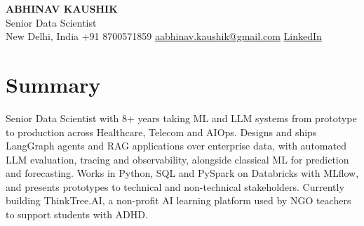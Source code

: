 \documentclass[10pt,a4paper]{article}
\begin{document}
\begin{center}
  {\LARGE\bfseries ABHINAV KAUSHIK}\\[2pt]
  {\large Senior Data Scientist}\\[2pt]
  New Delhi, India \textbar{} +91 8700571859 \textbar{} \href{mailto:aabhinav.kaushik@gmail.com}{aabhinav.kaushik@gmail.com} \textbar{} \href{https://www.linkedin.com/in/abhinav-kaushik10/}{LinkedIn}  
\end{center}

\section{Summary}
Senior Data Scientist with 8+ years taking ML and LLM systems from prototype to production across Healthcare, Telecom and AIOps. Designs and ships LangGraph agents and RAG applications over enterprise data, with automated LLM evaluation, tracing and observability, alongside classical ML for prediction and forecasting. Works in Python, SQL and PySpark on Databricks with MLflow, and presents prototypes to technical and non-technical stakeholders. Currently building ThinkTree.AI, a non-profit AI learning platform used by NGO teachers to support students with ADHD.
\end{document}

